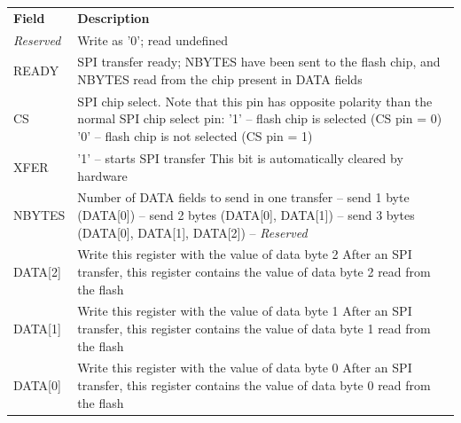 \documentclass[a4paper,11pt]{article}
\begin{document}
\begin{appendices}
{\begin{tabular}{l p{}}
  \textbf{Field}    & \textbf{Description} \\
  \textit{Reserved} & Write as '0'; read undefined \\
  READY             & SPI transfer ready; NBYTES have been sent to the flash chip,
                      and NBYTES read from the chip present in DATA fields \\
  CS                & SPI chip select. Note that this pin has opposite polarity
                      than the normal SPI chip select pin: \newline
                      '1' -- flash chip is selected (CS pin = 0) \newline
                      '0' -- flash chip is not selected (CS pin = 1) \\
  XFER              & '1' -- starts SPI transfer \newline
                      This bit is automatically cleared by hardware \\
  NBYTES            & Number of DATA fields to send in one transfer \newline
                      0 -- send 1 byte (DATA[0]) \newline
                      1 -- send 2 bytes (DATA[0], DATA[1]) \newline
                      2 -- send 3 bytes (DATA[0], DATA[1], DATA[2]) \newline
                      3 -- \textit{Reserved} \\
  DATA[2]           & Write this register with the value of data byte 2 \newline
                      After an SPI transfer, this register contains the value of
                      data byte 2 read from the flash \\
  DATA[1]           & Write this register with the value of data byte 1 \newline
                      After an SPI transfer, this register contains the value of
                      data byte 1 read from the flash \\
  DATA[0]           & Write this register with the value of data byte 0 \newline
                      After an SPI transfer, this register contains the value of
                      data byte 0 read from the flash \\
  \end{tabular}
}


\pagebreak

\end{appendices}
\end{document}
